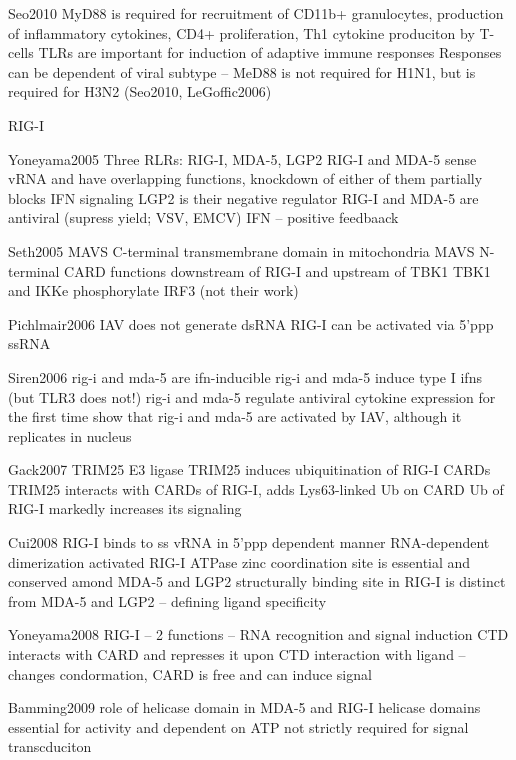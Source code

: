 				Seo2010
				MyD88 is required for recruitment of CD11b+ granulocytes, production of inflammatory cytokines, CD4+ proliferation, Th1 cytokine produciton by T-cells
				TLRs are important for induction of adaptive immune responses
				Responses can be dependent of viral subtype -- MeD88 is not required for H1N1, but is required for H3N2 (Seo2010, LeGoffic2006)
		
		RIG-I
		
			Yoneyama2005
				Three RLRs: RIG-I, MDA-5, LGP2
				RIG-I and MDA-5 sense vRNA and have overlapping functions, knockdown of either of them partially blocks IFN signaling
				LGP2 is their negative regulator
				RIG-I and MDA-5 are antiviral (supress yield; VSV, EMCV)
				IFN -- positive feedbaack
						
				Seth2005
				MAVS C-terminal transmembrane domain in mitochondria
				MAVS N-terminal CARD functions downstream of RIG-I and upstream of TBK1
				TBK1 and IKKe phosphorylate IRF3 (not their work)
				
				Pichlmair2006
				IAV does not generate dsRNA
				RIG-I can be activated via 5'ppp ssRNA
				
				Siren2006
				rig-i and mda-5 are ifn-inducible
				rig-i and mda-5 induce type I ifns (but TLR3 does not!)
				rig-i and mda-5 regulate antiviral cytokine expression
				for the first time show that rig-i and mda-5 are activated by IAV, although it replicates in nucleus
				
				Gack2007
				TRIM25 E3 ligase
				TRIM25 induces ubiquitination of RIG-I CARDs
				TRIM25 interacts with CARDs of RIG-I, adds Lys63-linked Ub on CARD
				Ub of RIG-I markedly increases its signaling
				
				Cui2008
				RIG-I binds to ss vRNA in 5'ppp dependent manner
				RNA-dependent dimerization activated RIG-I ATPase
				zinc coordination site is essential and conserved amond MDA-5 and LGP2
				structurally binding site in RIG-I is distinct from MDA-5 and LGP2 
				-- defining ligand specificity
				
				Yoneyama2008
				RIG-I -- 2 functions -- RNA recognition and signal induction
				CTD interacts with CARD and represses it
				upon CTD interaction with ligand -- changes condormation, CARD is free and can induce signal
				
				Bamming2009
				role of helicase domain in MDA-5 and RIG-I
			    helicase domains essential for activity and dependent on ATP
			    not strictly required for signal transcduciton
			     
